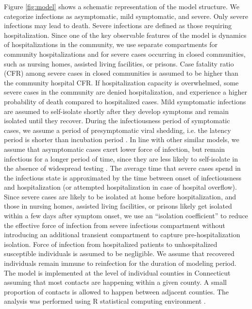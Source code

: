 \documentclass[11pt]{article}
\begin{document}
Figure \ref{fig:model} shows a schematic representation of the model structure. We categorize infections as asymptomatic, mild symptomatic, and severe. Only severe infections may lead to death. Severe infections are defined as those requiring hospitalization. Since one of the key observable features of the model is dynamics of hospitalizations in the community, we use separate compartments for community hospitalizations and for severe cases occurring in closed communities, such as nursing homes, assisted living facilities, or prisons. Case fatality ratio (CFR) among severe cases in closed communities is assumed to be higher than the community hospital CFR.  If hospitalization capacity is overwhelmed, some severe cases in the community are denied hospitalization, and experience a higher probability of death compared to hospitalized cases. Mild symptomatic infections are assumed to self-isolate shortly after they develop symptoms and remain isolated until they recover. During the infectiousness period of symptomatic cases, we assume a period of presymptomatic viral shedding, i.e. the latency period is shorter than incubation period \citep{furukawa2020evidence, liu2020contribution, he2020temporal}. In line with other similar models, we assume that asymptomatic cases exert lower force of infection, but remain infectious for a longer period of time, since they are less likely to self-isolate in the absence of widespread testing \citep{ferguson2020impact, childs2020impact, salomon2020defining}.  The average time that severe cases spend in the infectious state is approximated by the time between onset of infectiousness and hospitalization (or attempted hospitalization in case of hospital overflow). Since severe cases are likely to be isolated at home before hospitalization, and those in nursing homes, assisted living facilities, or prisons likely get isolated within a few days after symptom onset, we use an ``isolation coefficient'' to reduce the effective force of infection from severe infectious compartment without introducing an additional transient compartment to capture pre-hospitalization isolation. Force of infection from hospitalized patients to unhospitalized susceptible individuals is assumed to be negligible. We assume that recovered individuals remain immune to reinfection for the duration of modeling period.  The model is implemented at the level of individual counties in Connecticut assuming that most contacts are happening within a given county. A small proportion of contacts is allowed to happen between adjacent counties. 
The analysis was performed using R statistical computing environment \citep{R2020}.
\end{document}

